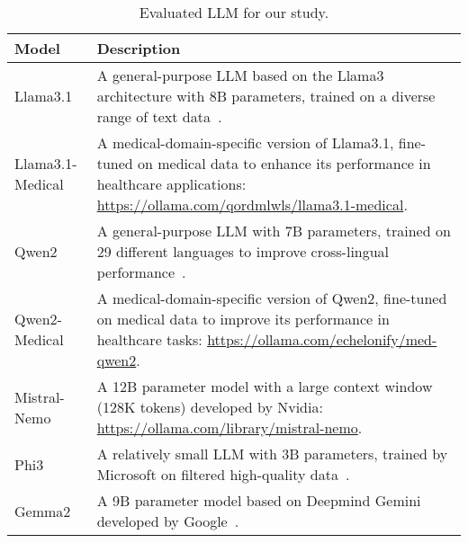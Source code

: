 \begin{table}
  \begin{tabular}{|l|p{}|}
      \hline
      \textbf{Model} & \textbf{Description} \\
      \hline
      Llama3.1 & A general-purpose \gls{LLM} based on the Llama3 architecture with 8B parameters, trained on a diverse range of text data~\cite{llama3}. \\
      \hline
      Llama3.1-Medical & A medical-domain-specific version of Llama3.1, fine-tuned on medical data to enhance its performance in healthcare applications: \url{https://ollama.com/qordmlwls/llama3.1-medical}. \\
      \hline
      Qwen2 & A general-purpose \gls{LLM} with 7B parameters, trained on 29 different languages to improve cross-lingual performance~\cite{qwen2}. \\
      \hline
      Qwen2-Medical & A medical-domain-specific version of Qwen2, fine-tuned on medical data to improve its performance in healthcare tasks: \url{https://ollama.com/echelonify/med-qwen2}. \\
      \hline
      Mistral-Nemo & A 12B parameter model with a large context window (128K tokens) developed by Nvidia: \url{https://ollama.com/library/mistral-nemo}. \\
      \hline
      Phi3 & A relatively small \gls{LLM} with 3B parameters, trained by Microsoft on filtered high-quality data~\cite{abdin2024phi3technicalreporthighly}. \\
      \hline
      Gemma2 & A 9B parameter model based on Deepmind Gemini developed by Google~\cite{gemmateam2024gemma2improvingopen}. \\
      \hline
  \end{tabular}
  \centering
  \caption{Evaluated \gls{LLM} for our study.}
  \label{tab:evaluated-llms}
\end{table}